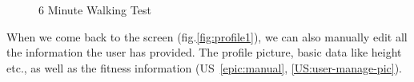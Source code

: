 \begin{figure}[h!]
    \centering
    \hfill
    \caption{6 Minute Walking Test}
    \label{fig:6mwt}
\end{figure}

When we come back to the  screen (fig.\ref{fig:profile1}), we can also manually edit all the information the user has provided.
The profile picture, basic data like height etc., as well as the fitness information (US~\ref{epic:manual}, \ref{US:user-manage-pic}).

